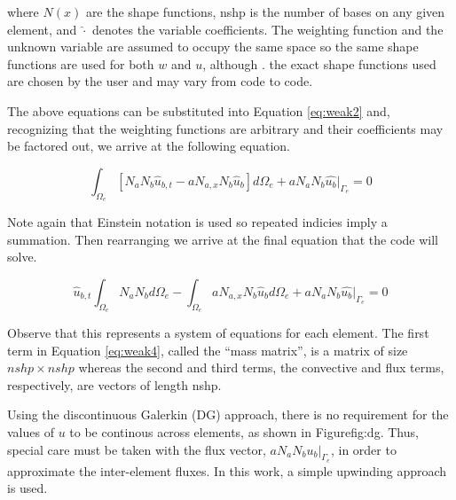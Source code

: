 \documentclass[11pt]{article}
\begin{document}
\noindent where $N(x)$ are the shape functions, nshp is the number of bases on 
any given element, and $\hat{\cdot}$ denotes the variable coefficients. 
The weighting function and the unknown variable are assumed to occupy the same space so the 
same shape functions are used for both $w$ and $u$, although . 
the exact shape functions used are chosen by the user and may vary from code to code.

The above equations can be substituted into Equation \eqref{eq:weak2} and, recognizing that the
weighting functions are arbitrary and their coefficients may be factored out, we arrive at the
following equation. 

\begin{equation}
\int_{\Omega_e} \left[ N_a N_b \hat{u}_{b,t} - a N_{a,x} N_b \hat{u}_b \right ]d{\Omega_e} + a N_a N_b \hat{u_b}|_{\Gamma_e}= 0
\label{eq:weak3}
\end{equation}

Note again that Einstein notation is used so repeated indicies imply a summation. Then
rearranging we arrive at the final equation that the code will solve. 
   
\begin{equation}
\hat{u}_{b,t} \int_{\Omega_e} N_a N_b d{\Omega_e} - \int_{\Omega_e} a N_{a,x} N_b \hat{u}_b d{\Omega_e} + a N_a N_b \hat{u_b}|_{\Gamma_e}= 0
\label{eq:weak4}
\end{equation}

Observe that this represents a system of equations for each element. 
The first term in Equation \eqref{eq:weak4}, called the ``mass matrix'',
is a matrix of size $nshp \times nshp$ whereas the second and third terms, the convective and 
flux terms, respectively, are vectors of length nshp.
 
Using the discontinuous Galerkin (DG) approach, there is no requirement for
the values of $u$ to be continous across elements, as shown in Figure{fig:dg}. 
Thus, special care must be taken with the flux vector, $a N_a N_b u_b |_{\Gamma_e}$,
in order to approximate the inter-element fluxes. In this work, a simple
upwinding approach is used. 
\end{document}

